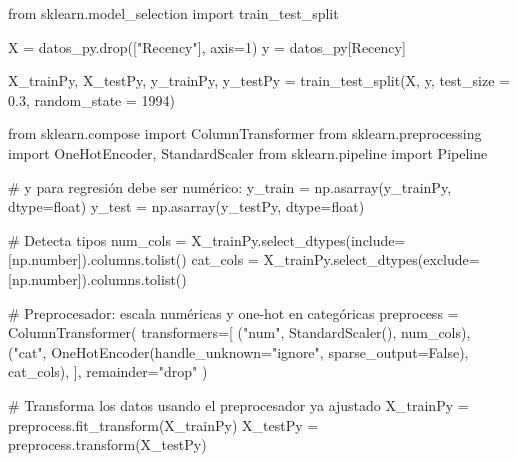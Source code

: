 \documentclass[
  letterpaper,
  DIV=11,
  numbers=noendperiod]{scrartcl}
\newenvironment{Shaded}{\begin{snugshade}}{\end{snugshade}}
\newcommand{\BuiltInTok}[1]{\textcolor[rgb]{0.00,0.23,0.31}{#1}}
\newcommand{\CommentTok}[1]{\textcolor[rgb]{0.37,0.37,0.37}{#1}}
\newcommand{\DecValTok}[1]{\textcolor[rgb]{0.68,0.00,0.00}{#1}}
\newcommand{\FloatTok}[1]{\textcolor[rgb]{0.68,0.00,0.00}{#1}}
\newcommand{\ImportTok}[1]{\textcolor[rgb]{0.00,0.46,0.62}{#1}}
\newcommand{\NormalTok}[1]{\textcolor[rgb]{0.00,0.23,0.31}{#1}}
\newcommand{\OperatorTok}[1]{\textcolor[rgb]{0.37,0.37,0.37}{#1}}
\newcommand{\StringTok}[1]{\textcolor[rgb]{0.13,0.47,0.30}{#1}}
\newcommand{\VariableTok}[1]{\textcolor[rgb]{0.07,0.07,0.07}{#1}}
\begin{document}
\begin{Shaded}
\begin{Highlighting}[]
\ImportTok{from}\NormalTok{ sklearn.model\_selection }\ImportTok{import}\NormalTok{ train\_test\_split}

\NormalTok{X }\OperatorTok{=}\NormalTok{ datos\_py.drop([}\StringTok{"Recency"}\NormalTok{], axis}\OperatorTok{=}\DecValTok{1}\NormalTok{)}
\NormalTok{y }\OperatorTok{=}\NormalTok{ datos\_py[}\StringTok{\textquotesingle{}Recency\textquotesingle{}}\NormalTok{]}

\NormalTok{X\_trainPy, X\_testPy, y\_trainPy, y\_testPy }\OperatorTok{=}\NormalTok{ train\_test\_split(X, y, test\_size }\OperatorTok{=} \FloatTok{0.3}\NormalTok{, random\_state }\OperatorTok{=} \DecValTok{1994}\NormalTok{)}

\ImportTok{from}\NormalTok{ sklearn.compose }\ImportTok{import}\NormalTok{ ColumnTransformer}
\ImportTok{from}\NormalTok{ sklearn.preprocessing }\ImportTok{import}\NormalTok{ OneHotEncoder, StandardScaler}
\ImportTok{from}\NormalTok{ sklearn.pipeline }\ImportTok{import}\NormalTok{ Pipeline}

\CommentTok{\# y para regresión debe ser numérico:}
\NormalTok{y\_train }\OperatorTok{=}\NormalTok{ np.asarray(y\_trainPy, dtype}\OperatorTok{=}\BuiltInTok{float}\NormalTok{)}
\NormalTok{y\_test  }\OperatorTok{=}\NormalTok{ np.asarray(y\_testPy,  dtype}\OperatorTok{=}\BuiltInTok{float}\NormalTok{)}

\CommentTok{\# Detecta tipos}
\NormalTok{num\_cols }\OperatorTok{=}\NormalTok{ X\_trainPy.select\_dtypes(include}\OperatorTok{=}\NormalTok{[np.number]).columns.tolist()}
\NormalTok{cat\_cols }\OperatorTok{=}\NormalTok{ X\_trainPy.select\_dtypes(exclude}\OperatorTok{=}\NormalTok{[np.number]).columns.tolist()}

\CommentTok{\# Preprocesador: escala numéricas y one{-}hot en categóricas}
\NormalTok{preprocess }\OperatorTok{=}\NormalTok{ ColumnTransformer(}
\NormalTok{    transformers}\OperatorTok{=}\NormalTok{[}
\NormalTok{        (}\StringTok{"num"}\NormalTok{, StandardScaler(), num\_cols),}
\NormalTok{        (}\StringTok{"cat"}\NormalTok{, OneHotEncoder(handle\_unknown}\OperatorTok{=}\StringTok{"ignore"}\NormalTok{, sparse\_output}\OperatorTok{=}\VariableTok{False}\NormalTok{), cat\_cols),}
\NormalTok{    ],}
\NormalTok{    remainder}\OperatorTok{=}\StringTok{"drop"}
\NormalTok{)}

\CommentTok{\# Transforma los datos usando el preprocesador ya ajustado}
\NormalTok{X\_trainPy }\OperatorTok{=}\NormalTok{ preprocess.fit\_transform(X\_trainPy)}
\NormalTok{X\_testPy  }\OperatorTok{=}\NormalTok{ preprocess.transform(X\_testPy)}
\end{Highlighting}
\end{Shaded}
\end{document}
